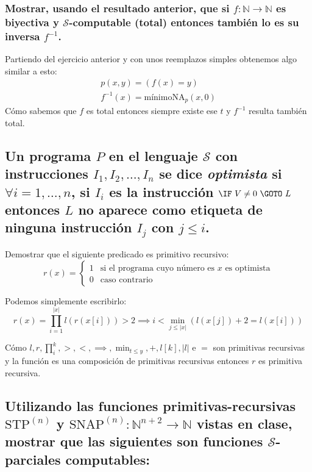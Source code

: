 \documentclass[fleqn, 11pt]{article}
\newcommand{\nat}{\mathbb{N}}
\newcommand{\Scur}{\mathcal{S}}
\newcommand{\STP}[1][n]{\text{STP}^{(#1)}}
\newcommand{\SNAP}[1][n]{\text{SNAP}^{(#1)}}
\begin{document}
\subsubsection{Mostrar, usando el resultado anterior, que si
$f : \nat \to \nat$ es biyectiva y $\Scur$-computable (total) entonces también
lo es su inversa $f^{-1}$.}

Partiendo del ejercicio anterior y con unos reemplazos simples obtenemos algo
similar a esto:
\begin{gather*}
	p(x, y) = (f(x) = y) \\
	f^{-1}(x) = \text{mínimoNA}_p(x, 0)
\end{gather*}
Cómo sabemos que $f$ es total entonces siempre existe ese $t$ y $f^{-1}$
resulta también total.

\subsection{Un programa $P$ en el lenguaje $\Scur$ con instrucciones $I_1, I_2,
\dots, I_n$ se dice \emph{optimista} si $\forall i = 1, \dots, n$, si $I_i$ es
la instrucción $\IF\ V \neq 0\ \GOTO\ L$ entonces $L$ no aparece como etiqueta
de ninguna instrucción $I_j$ con $j \leq i$.}

Demostrar que el siguiente predicado es primitivo recursivo:
\[
	r(x) =
	\begin{cases}
		1 & \text{si el programa cuyo número es $x$ es optimista} \\
		0 & \text{caso contrario}
	\end{cases}
\]

Podemos simplemente escribirlo:
\[
	r(x) = \prod_{i=1}^{|x|} l(r(x[i])) > 2
		\implies i < \min_{j \leq |x|}(l(x[j]) + 2 = l(x[i]))
\]

Cómo $l, r, \prod_i^k, >, <, \implies, \min_{t \leq y}, +, l[k], |l|$ e $=$ son
primitivas recursivas y la función es una composición de primitivas recursivas
entonces $r$ es primitiva recursiva.

\subsection{Utilizando las funciones primitivas-recursivas $\STP$ y $\SNAP :
\nat^{n+2} \to \nat$ vistas en clase, mostrar que las siguientes son funciones
$\Scur$-parciales computables:}
\end{document}
